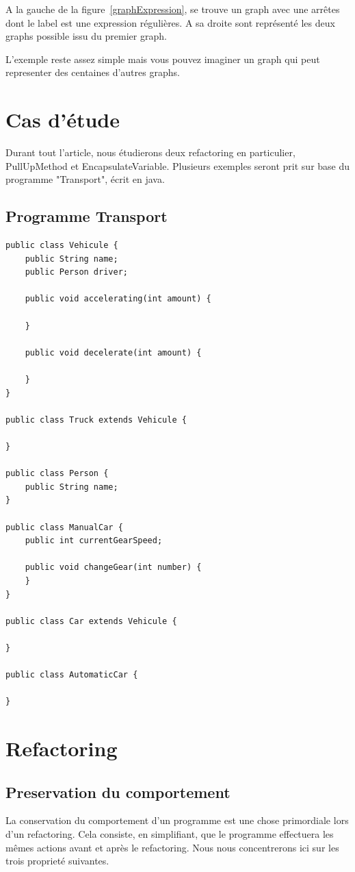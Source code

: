 \documentclass[a4paper, 12pt]{article}
\begin{document}
A la gauche de la figure~\ref{graphExpression}, se trouve un graph avec une arrêtes dont le label est une expression régulières. A sa droite sont représenté les deux graphs possible issu du premier graph.

L'exemple reste assez simple mais vous pouvez imaginer un graph qui peut representer des centaines d'autres graphs.

\section{Cas d'étude}

Durant tout l'article, nous étudierons deux refactoring en particulier, PullUpMethod et EncapsulateVariable. Plusieurs exemples seront prit sur base du programme "Transport", écrit en java.

\subsection{Programme Transport}

\begin{lstlisting}[frame=single]
public class Vehicule {
	public String name;
	public Person driver;

	public void accelerating(int amount) {

	}

	public void decelerate(int amount) {
	
	}
}

public class Truck extends Vehicule {

}

public class Person {
	public String name;
}

public class ManualCar {
	public int currentGearSpeed;
	
	public void changeGear(int number) {
	}
}

public class Car extends Vehicule {

}

public class AutomaticCar {

}
\end{lstlisting}

\newpage
\section{Refactoring}

\subsection{Preservation du comportement}
\label{subsec:preservationDuComportement}
La conservation du comportement d'un programme est une chose primordiale lors d'un refactoring. Cela consiste, en simplifiant, que le programme effectuera les mêmes actions avant et après le refactoring. Nous nous concentrerons ici sur les trois proprieté suivantes.
\end{document}
